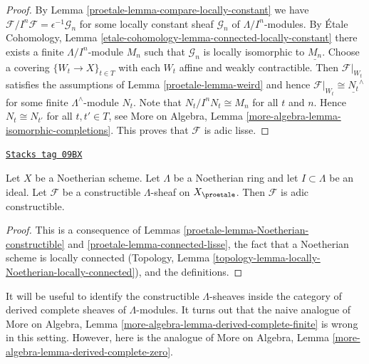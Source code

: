 \begin{proof}

By Lemma \ref{proetale-lemma-compare-locally-constant} we have
$\mathcal{F}/I^n\mathcal{F} = \epsilon^{-1}\mathcal{G}_n$
for some locally constant sheaf $\mathcal{G}_n$ of $\Lambda/I^n$-modules. By
\'Etale Cohomology, Lemma
\ref{etale-cohomology-lemma-connected-locally-constant}
there exists a finite $\Lambda/I^n$-module $M_n$ such that
$\mathcal{G}_n$ is locally isomorphic to $\underline{M_n}$.
Choose a covering $\{W_t \to X\}_{t \in T}$ with each $W_t$
affine and weakly contractible.
Then $\mathcal{F}|_{W_t}$ satisfies the assumptions of
Lemma \ref{proetale-lemma-weird}
and hence $\mathcal{F}|_{W_t} \cong \underline{N_t}^\wedge$
for some finite $\Lambda^\wedge$-module $N_t$. Note that
$N_t/I^nN_t \cong M_n$ for all $t$ and $n$. Hence
$N_t \cong N_{t'}$ for all $t, t' \in T$, see
More on Algebra, Lemma \ref{more-algebra-lemma-isomorphic-completions}.
This proves that $\mathcal{F}$ is adic lisse.
\end{proof}

\begin{lemma}
\label{proetale-lemma-Noetherian-adic-constructible}
\href{https://stacks.math.columbia.edu/tag/09BX}{\texttt{Stacks tag 09BX}}

Let $X$ be a Noetherian scheme. Let $\Lambda$ be a Noetherian ring and
let $I \subset \Lambda$ be an ideal. Let $\mathcal{F}$ be a
constructible $\Lambda$-sheaf on $X_\proetale$. Then $\mathcal{F}$
is adic constructible.
\end{lemma}

\begin{proof}

This is a consequence of Lemmas \ref{proetale-lemma-Noetherian-constructible} and
\ref{proetale-lemma-connected-lisse}, the fact that a Noetherian scheme
is locally connected
(Topology, Lemma \ref{topology-lemma-locally-Noetherian-locally-connected}),
and the definitions.
\end{proof}

It will be useful to identify the constructible $\Lambda$-sheaves
inside the category of derived complete sheaves of $\Lambda$-modules.
It turns out that the naive analogue of
More on Algebra, Lemma \ref{more-algebra-lemma-derived-complete-finite}
is wrong in this setting. However, here
is the analogue of More on Algebra, Lemma
\ref{more-algebra-lemma-derived-complete-zero}.

